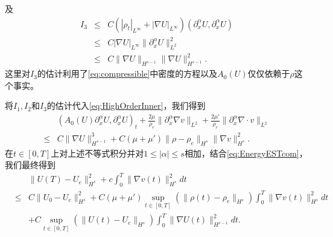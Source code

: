 及
\begin{eqnarray*}
  I_3 &\le& C (|\rho_t|_{L^\infty} + |\nabla U|_{L^\infty}) (\partial_x^\alpha U,\partial_x^\alpha U) \\
      &\le& C |\nabla U|_{L^\infty} \|\partial_x^\alpha U\|_{L^2}^2 \\
      &\le& C \|\nabla U\|_{H^{s-1}} \|\nabla U\|_{H^{s-1}}^2.
\end{eqnarray*}
这里对$I_3$的估计利用了\eqref{eq:compressible}中密度的方程以及$A_0(U)$仅仅依赖于$\rho$这个事实。

将$I_1, I_2$和$I_3$的估计代入\eqref{eq:HighOrderInner}，我们得到
\begin{eqnarray*}
  & (A_0(U)\partial_x^\alpha U,\partial_x^\alpha U)_t + \frac{2\mu}{\rho_e} \|\partial_x^\alpha \nabla  v \|_{L^2}  + \frac{2\mu'}{\rho_e} \|\partial_x^\alpha \nabla \cdot  v \|_{L^2}   \\
\le &C \| \nabla U\|_{H^{s-1}}^3 + C(\mu+\mu')\|\rho -\rho_e\|_{H^s} \|\nabla  v \|_{H^s}^2.\nonumber
\end{eqnarray*}
在$ t\in [0,T]$上对上述不等式积分并对$1 \le |\alpha| \le s$相加，结合\eqref{eq:EnergyESTcom}，我们最终得到
\begin{eqnarray}\label{eq:Step2Resultcom}
  && \| U(T) - U_e\|_{H^s}^2 + c\int_0^T \|\nabla  v  (t)\|_{H^s}^2 dt  \\
  &\le& C \|U_0 - U_e\|_{H^s}^2+ C (\mu + \mu') \sup_{t \in [0,T]} (\|\rho(t) -\rho_e\|_{H^s}) \int_0^T \|\nabla  v (t)\|_{H^s}^2 dt \nonumber\\
  &&+ C \sup_{t \in [0,T]} (\|U(t) - U_e\|_{H^s}) \int_0^T \|\nabla U(t)\|_{H^{s-1}}^2 dt . \nonumber
\end{eqnarray}

